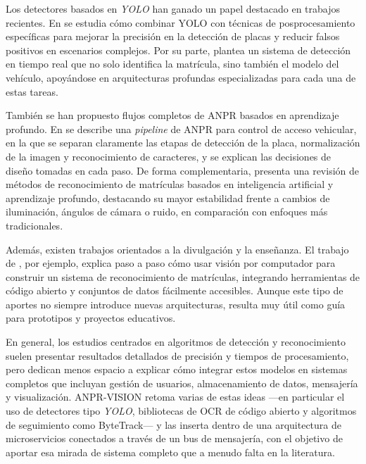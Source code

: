 Los detectores basados en \textit{YOLO} han ganado un papel destacado en trabajos recientes. En \cite{yolo_high_precision_lpr_2024} se estudia cómo combinar YOLO con técnicas de posprocesamiento específicas para mejorar la precisión en la detección de placas y reducir falsos positivos en escenarios complejos. Por su parte, \cite{car_model_plate_dl_2024} plantea un sistema de detección en tiempo real que no solo identifica la matrícula, sino también el modelo del vehículo, apoyándose en arquitecturas profundas especializadas para cada una de estas tareas.

También se han propuesto flujos completos de ANPR basados en aprendizaje profundo. En \cite{deep_anpr_pipeline_access_control_2022} se describe una \textit{pipeline} de ANPR para control de acceso vehicular, en la que se separan claramente las etapas de detección de la placa, normalización de la imagen y reconocimiento de caracteres, y se explican las decisiones de diseño tomadas en cada paso. De forma complementaria, \cite{lpr_ai_dl_2025} presenta una revisión de métodos de reconocimiento de matrículas basados en inteligencia artificial y aprendizaje profundo, destacando su mayor estabilidad frente a cambios de iluminación, ángulos de cámara o ruido, en comparación con enfoques más tradicionales.

Además, existen trabajos orientados a la divulgación y la enseñanza. El trabajo de \cite{cv_system_lpr_tutorial}, por ejemplo, explica paso a paso cómo usar visión por computador para construir un sistema de reconocimiento de matrículas, integrando herramientas de código abierto y conjuntos de datos fácilmente accesibles. Aunque este tipo de aportes no siempre introduce nuevas arquitecturas, resulta muy útil como guía para prototipos y proyectos educativos.

En general, los estudios centrados en algoritmos de detección y reconocimiento suelen presentar resultados detallados de precisión y tiempos de procesamiento, pero dedican menos espacio a explicar cómo integrar estos modelos en sistemas completos que incluyan gestión de usuarios, almacenamiento de datos, mensajería y visualización. ANPR-VISION retoma varias de estas ideas —en particular el uso de detectores tipo \textit{YOLO}, bibliotecas de OCR de código abierto y algoritmos de seguimiento como ByteTrack— y las inserta dentro de una arquitectura de microservicios conectados a través de un bus de mensajería, con el objetivo de aportar esa mirada de sistema completo que a menudo falta en la literatura.

